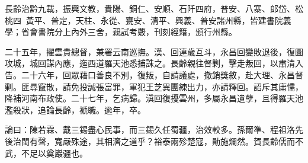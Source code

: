 \begin{pinyinscope}
長齡治黔九載，振興文教，貴陽、銅仁、安順、石阡四府，普安、八寨、郎岱、松桃四，黃平、普定，天柱、永從、甕安、清平、興義、普安諸州縣，皆建書院義學；省會書院分上內外三舍，親試考覈，刊刻經籍，頒行州縣。

二十五年，擢雲貴總督，兼署云南巡撫。漢、回連歲互斗，永昌回變敗退後，復圖攻城，城回謀內應，迤西道羅天池悉捕誅之。長齡親往督剿，擊走叛回，以肅清入告。二十六年，回眾藉口善良不別，復叛，自請議處，撤銷獎敘，赴大理、永昌督剿。匪尋竄散，請免投誠張富罪，軍犯王芝異團練出力，亦請釋回。詔斥其庸懦，降補河南布政使。二十七年，乞病歸。滇回復擾雲州，多屬永昌遺孽，且得羅天池濫殺狀，追論長齡，褫職。逾年，卒。

論曰：陳若霖、戴三錫盡心民事，而三錫久任蜀疆，治效較多。孫爾準、程祖洛先後治閩有聲，寬嚴殊途，其相濟之道乎？裕泰兩殄楚寇，勛施爛然。賀長齡儒而不武，不足以奠巖疆也。


\end{pinyinscope}